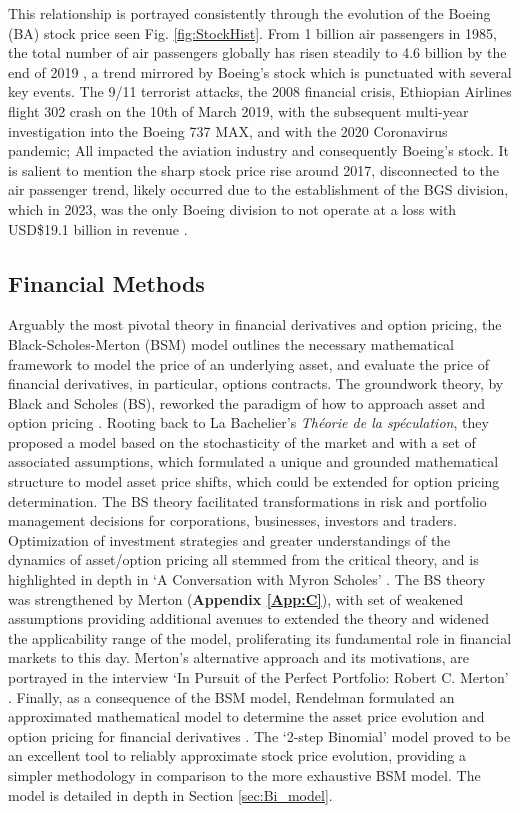 \documentclass[
	a4paper, %
	11pt, %
	twoside, %
]{LTJournalArticle}
\begin{document}
This relationship is portrayed consistently through the evolution of the Boeing (BA) stock price seen Fig. \ref{fig:StockHist}.
From 1 billion air passengers in 1985, the total number of air passengers globally has risen steadily to 4.6 billion by the end of 2019 \cite{AirTrafficData}, a trend mirrored by Boeing's stock which is punctuated with several key events.
The 9/11 terrorist attacks, the 2008 financial crisis, Ethiopian Airlines flight 302 crash on the 10th of March 2019, with the subsequent multi-year investigation into the Boeing 737 MAX, and with the 2020 Coronavirus pandemic; All impacted the aviation industry and consequently Boeing's stock.
It is salient to mention the sharp stock price rise around 2017, disconnected to the air passenger trend, likely occurred due to the establishment of the BGS division, which in 2023, was the only Boeing division to not operate at a loss with USD\$19.1 billion in revenue \cite{Boeing_finance_report}.
\subsection{Financial Methods}
Arguably the most pivotal theory in financial derivatives and option pricing, the Black-Scholes-Merton (BSM) model outlines the necessary mathematical framework to model the price of an underlying asset, and evaluate the price of financial derivatives, in particular, options contracts.
The groundwork theory, by Black and Scholes (BS), reworked the paradigm of how to approach asset and option pricing \cite{BS_1973}.
Rooting back to La Bachelier's \textit{Th\'eorie de la sp\'eculation}, they proposed a model based on the stochasticity of the market and with a set of associated assumptions, which formulated a unique and grounded mathematical structure to model asset price shifts, which could be extended for option pricing determination.
The BS theory facilitated transformations in risk and portfolio management decisions for corporations, businesses, investors and traders.
Optimization of investment strategies and greater understandings of the dynamics of asset/option pricing all stemmed from the critical theory, and is highlighted in depth in `A Conversation with Myron Scholes' \cite{Scholes_inter}.
The BS theory was strengthened by Merton (\textbf{Appendix \ref*{App:C}}), with set of weakened assumptions providing additional avenues to extended the theory and widened the applicability range of the model, proliferating its fundamental role in financial markets to this day.
Merton's alternative approach and its motivations, are portrayed in the interview `In Pursuit of the Perfect Portfolio: Robert C. Merton' \cite{Merton_inter}.
Finally, as a consequence of the BSM model, Rendelman formulated an approximated mathematical model to determine the asset price evolution and option pricing for financial derivatives \cite{Rendelman_1979}.
The `2-step Binomial' model proved to be an excellent tool to reliably approximate stock price evolution, providing a simpler methodology in comparison to the more exhaustive BSM model.
The model is detailed in depth in Section \ref{sec:Bi_model}.
\end{document}
